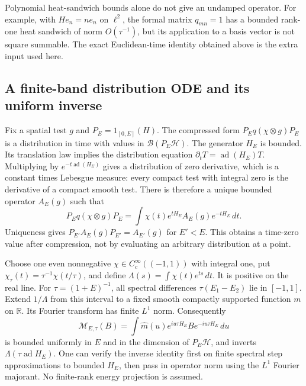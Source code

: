 Polynomial heat-sandwich bounds alone do not give an undamped operator.
For example, with $He_n=ne_n$ on $\ell^2$, the formal matrix $q_{mn}=1$
has a bounded rank-one heat sandwich of norm $O(\tau^{-1})$, but its
application to a basis vector is not square summable.  The exact
Euclidean-time identity obtained above is the extra input used here.

\subsection{A finite-band distribution ODE and its uniform inverse}

Fix a spatial test $g$ and $P_E=1_{[0,E]}(H)$.  The compressed form
$P_Eq(\chi\otimes g)P_E$ is a distribution in time with values in
$\mathcal B(P_E\mathcal H)$.  The generator $H_E$ is bounded.  Its
translation law implies the distribution equation
$\partial_tT=\operatorname{ad}(H_E)T$.  Multiplying by
$e^{-t\operatorname{ad}(H_E)}$ gives a distribution of zero derivative,
which is a constant times Lebesgue measure: every compact test with
integral zero is the derivative of a compact smooth test.  There is
therefore a unique bounded operator $A_E(g)$ such that
\begin{equation}
 P_Eq(\chi\otimes g)P_E
    =\int\chi(t)e^{tH_E}A_E(g)e^{-tH_E}\,dt.
 \label{ha:distribution-ode}
\end{equation}
Uniqueness gives $P_{E'}A_E(g)P_{E'}=A_{E'}(g)$ for $E'<E$.
This obtains a time-zero value after compression, not by evaluating
an arbitrary distribution at a point.

Choose one even nonnegative $\chi\in C_c^\infty((-1,1))$ with integral
one, put $\chi_\tau(t)=\tau^{-1}\chi(t/\tau)$, and define
$\Lambda(s)=\int\chi(t)e^{ts}\,dt$.  It is positive on the real line.
For $\tau=(1+E)^{-1}$, all spectral differences $\tau(E_1-E_2)$ lie
in $[-1,1]$.  Extend $1/\Lambda$ from this interval to a fixed smooth
compactly supported function $m$ on $\mathbb R$.  Its Fourier transform
has finite $L^1$ norm.  Consequently
\begin{equation}
 \mathcal M_{E,\tau}(B)=\int\widehat m(u)
                e^{iu\tau H_E}Be^{-iu\tau H_E}\,du
 \label{ha:laplace-inverse}
\end{equation}
is bounded uniformly in $E$ and in the dimension of $P_E\mathcal H$,
and inverts $\Lambda(\tau\operatorname{ad}H_E)$.
One can verify the inverse identity first on finite spectral step
approximations to bounded $H_E$, then pass in operator norm using the
$L^1$ Fourier majorant.  No finite-rank energy projection is assumed.

